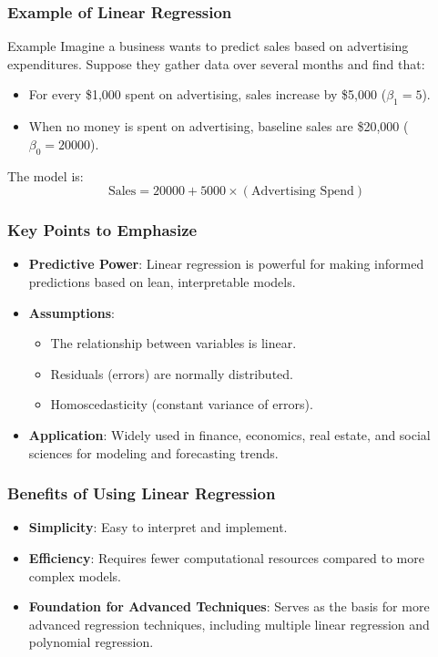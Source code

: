 \documentclass{beamer}
\begin{document}
\begin{frame}[fragile]
    \frametitle{Example of Linear Regression}
    \begin{block}{Example}
        Imagine a business wants to predict sales based on advertising expenditures. Suppose they gather data over several months and find that:
        \begin{itemize}
            \item For every \$1,000 spent on advertising, sales increase by \$5,000 (\(\beta_1 = 5\)).
            \item When no money is spent on advertising, baseline sales are \$20,000 (\(\beta_0 = 20000\)).
        \end{itemize}
        The model is:
        \begin{equation}
            \text{Sales} = 20000 + 5000 \times (\text{Advertising Spend})
        \end{equation}
    \end{block}
\end{frame}

\begin{frame}[fragile]
    \frametitle{Key Points to Emphasize}
    \begin{itemize}
        \item \textbf{Predictive Power}: Linear regression is powerful for making informed predictions based on lean, interpretable models.
        \item \textbf{Assumptions}:
        \begin{itemize}
            \item The relationship between variables is linear.
            \item Residuals (errors) are normally distributed.
            \item Homoscedasticity (constant variance of errors).
        \end{itemize}
        \item \textbf{Application}: Widely used in finance, economics, real estate, and social sciences for modeling and forecasting trends.
    \end{itemize}
\end{frame}

\begin{frame}[fragile]
    \frametitle{Benefits of Using Linear Regression}
    \begin{itemize}
        \item \textbf{Simplicity}: Easy to interpret and implement.
        \item \textbf{Efficiency}: Requires fewer computational resources compared to more complex models.
        \item \textbf{Foundation for Advanced Techniques}: Serves as the basis for more advanced regression techniques, including multiple linear regression and polynomial regression.
    \end{itemize}
\end{frame}
\end{document}
